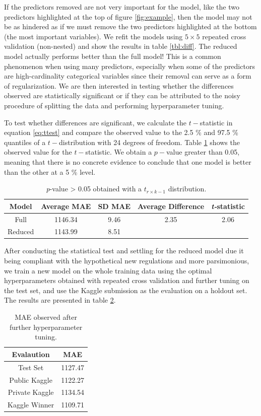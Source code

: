 \documentclass[11pt,a4paper]{article}
\theoremstyle{plain}
\theoremstyle{definition}
\begin{document}
If the predictors removed are not very important for the model, like the two predictors highlighted at the top of figure \ref{fig:example}, then the model may not be as hindered as if we must remove the two predictors highlighted at the bottom (the most important variables). We refit the models using $5\times 5$ repeated cross validation (non-nested) and show the results in table \ref{tbl:diff}. The reduced model actually performs better than the full model! This is a common phenomenon when using many predictors, especially when some of the predictors are high-cardinality categorical variables since their removal can serve as a form of regularization. We are then interested in testing whether the differences observed are statistically significant or if they can be attributed to the noisy procedure of splitting the data and performing hyperparameter tuning.

To test whether differences are significant, we calculate the $t-$statistic in equation \ref{eq:ttest} and compare the observed value to the 2.5 \% and 97.5 \% quantiles of a $t-$distribution with 24 degrees of freedom. Table \ref{tbl:ttest} shows the observed value for the $t-$statistic. We obtain a $p-$value greater than 0.05, meaning that there is no concrete evidence to conclude that one model is better than the other at a 5 \% level.

\begin{table}[ht]
\centering
\begin{tabular}{|c|c|c|c|c|}
\hline
Model & Average MAE & SD MAE & Average Difference & \textit{t-}statistic\\
\hline
Full & 1146.34 & 9.46 & 2.35 & 2.06\\
Reduced & 1143.99 & 8.51 & &\\
\hline
\end{tabular}
\caption{\textit{p}-value > 0.05 obtained with a $t_{r\times k-1}$ distribution.}
\label{tbl:ttest}
\end{table}

After conducting the statistical test and settling for the reduced model due it being compliant with the hypothetical new regulations and more parsimonious, we train a new model on the whole training data using the optimal hyperparameters obtained with repeated cross validation and further tuning on the test set, and use the Kaggle submission as the evaluation on a holdout set. The results are presented in table \ref{tbl:results}.

\begin{table}[ht]
\centering
\begin{tabular}{|c|c|}
\hline
Evalaution & MAE\\
\hline
Test Set & 1127.47\\
Public Kaggle & 1122.27\\
Private Kaggle & 1134.54\\
Kaggle Winner & 1109.71\\
\hline
\end{tabular}
\caption{MAE observed after further hyperparameter tuning.}
\label{tbl:results}
\end{table}
\end{document}
